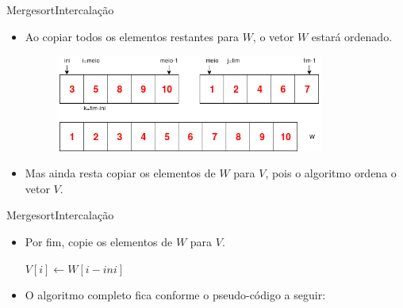 \documentclass[aspectratio=169]{beamer}
\begin{document}

\begin{frame}{Mergesort}{Intercalação}
\begin{itemize}
 \item Ao copiar todos os elementos restantes para $W$, o vetor $W$ estará ordenado.

\begin{figure}[!h]
  \centering
  \includegraphics[width=250pt]{imgs/merge/merge9.png}
  \label{fig_merge9}
\end{figure}

\item Mas ainda resta copiar os elementos de $W$ para $V$, pois o algoritmo ordena o vetor $V$.
\end{itemize}
\end{frame}


\begin{frame}{Mergesort}{Intercalação}
\begin{itemize}
\item Por fim, copie os elementos de $W$ para $V$.
\begin{algorithm}[H]
	 {
		$V[i] \leftarrow W[i- ini]$\\
	}
\end{algorithm}
\item O algoritmo completo fica conforme o pseudo-código a seguir:
\end{itemize}
\end{frame}

\end{document}
